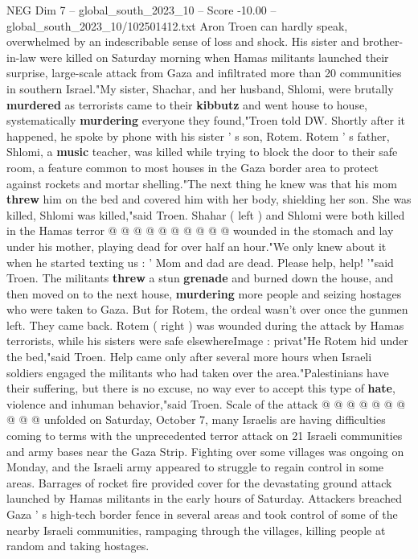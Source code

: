 \begin{textsample}{NEG Dim 7 – global\_south\_2023\_10 – Score -10.00 – global\_south\_2023\_10/102501412.txt}  \label{ex:f7_neg_311}
Aron Troen can hardly speak, overwhelmed by an indescribable sense of loss and shock.
His sister and brother-in-law were killed on Saturday morning when Hamas militants launched their surprise, large-scale attack from Gaza and infiltrated more than 20 communities in southern Israel."My sister, Shachar, and her husband, Shlomi, were brutally \textbf{murdered} as terrorists came to their \textbf{kibbutz} and went house to house, systematically \textbf{murdering} everyone they found,"Troen told DW.
Shortly after it happened, he spoke by phone with his sister ' s son, Rotem.
Rotem ' s father, Shlomi, a \textbf{music} teacher, was killed while trying to block the door to their safe room, a feature common to most houses in the Gaza border area to protect against rockets and mortar shelling."The next thing he knew was that his mom \textbf{threw} him on the bed and covered him with her body, shielding her son.
She was killed, Shlomi was killed,"said Troen.
Shahar ( left ) and Shlomi were both killed in the Hamas terror @ @ @ @ @ @ @ @ @ @ wounded in the stomach and lay under his mother, playing dead for over half an hour."We only knew about it when he started texting us : ' Mom and dad are dead.
Please help, help! '"said Troen.
The militants \textbf{threw} a stun \textbf{grenade} and burned down the house, and then moved on to the next house, \textbf{murdering} more people and seizing hostages who were taken to Gaza.
But for Rotem, the ordeal wasn't over once the gunmen left.
They came back.
Rotem ( right ) was wounded during the attack by Hamas terrorists, while his sisters were safe elsewhereImage : privat"He Rotem hid under the bed,"said Troen.
Help came only after several more hours when Israeli soldiers engaged the militants who had taken over the area."Palestinians have their suffering, but there is no excuse, no way ever to accept this type of \textbf{hate}, violence and inhuman behavior,"said Troen.
Scale of the attack @ @ @ @ @ @ @ @ @ @ unfolded on Saturday, October 7, many Israelis are having difficulties coming to terms with the unprecedented terror attack on 21 Israeli communities and army bases near the Gaza Strip.
Fighting over some villages was ongoing on Monday, and the Israeli army appeared to struggle to regain control in some areas.
Barrages of rocket fire provided cover for the devastating ground attack launched by Hamas militants in the early hours of Saturday.
Attackers breached Gaza ' s high-tech border fence in several areas and took control of some of the nearby Israeli communities, rampaging through the villages, killing people at random and taking hostages.

\end{textsample}

